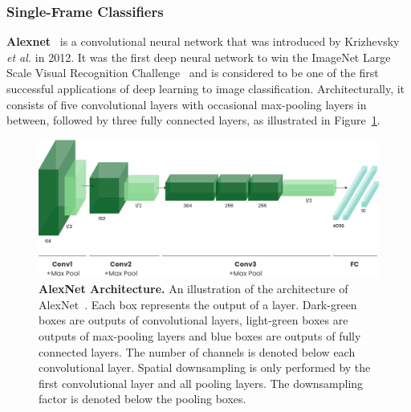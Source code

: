\documentclass[a4paper]{article}
\begin{document}
\subsubsection{Single-Frame Classifiers} %

\textbf{Alexnet}~\cite{alexnet} is a convolutional neural network that was
introduced by Krizhevsky \textit{et al.} in 2012. It was the first deep neural
network to win the ImageNet Large Scale Visual Recognition
Challenge~\cite{imagenet} and is considered to be one of the first successful
applications of deep learning to image classification. Architecturally, it
consists of five convolutional layers with occasional max-pooling layers in
between, followed by three fully connected layers, as illustrated in
Figure~\ref{fig:alexnet}.

\begin{figure}
  \centering
  \includegraphics[width=\textwidth]{./figures/alexnet.png}
  \caption{\textbf{AlexNet Architecture.} An illustration of the architecture of
    AlexNet~\cite{alexnet}. Each box represents the output of a layer.
    Dark-green boxes are outputs of convolutional layers, light-green boxes are
    outputs of max-pooling layers and blue boxes are outputs of fully connected
    layers. The number of channels is denoted below each convolutional layer.
    Spatial downsampling is only performed by the first convolutional layer and
    all pooling layers. The downsampling factor is denoted below the pooling
    boxes.
  }
  \label{fig:alexnet}
\end{figure}

\end{document}

